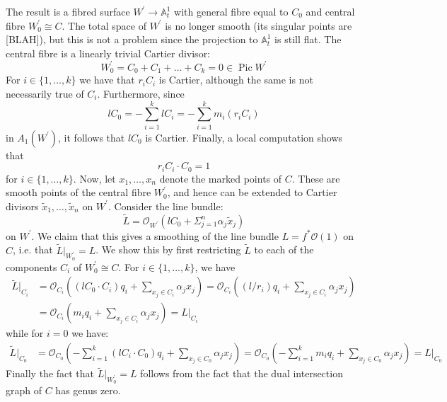 \documentclass[11pt]{amsart}
\newcommand{\OO}{\mathcal{O}}
\renewcommand{\to}{\rightarrow}
\newcommand{\Aaff}{\mathbb{A}}
\newcommand{\Pic}{\operatorname{Pic}}
\theoremstyle{definition}
\theoremstyle{definition}
\begin{document}
The result is a fibred surface $W^\prime \to \Aaff^1_t$ with general fibre equal to $C_0$ and central fibre $W^\prime_0 \cong C$. The total space of $W^\prime$ is no longer smooth (its singular points are [BLAH]), but this is not a problem since the projection to $\Aaff^1_t$ is still flat. The central fibre is a linearly trivial Cartier divisor:
\begin{equation*} W^\prime_0 = C_0 + C_1 + \ldots + C_k = 0 \in \Pic W^\prime \end{equation*}
For $i \in \{1,\ldots,k\}$ we have that $r_i C_i$ is Cartier, although the same is not necessarily true of $C_i$. Furthermore, since
\begin{equation*} l C_0 = - \sum_{i=1}^k l C_i = - \sum_{i=1}^k m_i (r_i C_i) \end{equation*}
in $A_1(W^\prime)$, it follows that $lC_0$ is Cartier. Finally, a local computation shows that
\begin{equation*} r_i C_i \cdot C_0 = 1 \end{equation*}
for $i \in \{1,\ldots,k\}$. Now, let $x_1,\ldots,x_n$ denote the marked points of $C$. These are smooth points of the central fibre $W^\prime_0$, and hence can be extended to Cartier divisors $\tilde{x}_1,\ldots,\tilde{x}_n$ on $W^\prime$. Consider the line bundle:
\begin{equation*} \tilde{L} = \OO_{W^\prime}(l C_0 + \Sigma_{j=1}^n \alpha_j \tilde{x}_j) \end{equation*}
on $W^\prime$. We claim that this gives a smoothing of the line bundle $L=f^*\OO(1)$ on $C$, i.e. that $\tilde{L}|_{W^\prime_0} = L$. We show this by first restricting $\tilde{L}$ to each of the components $C_i$ of $W^\prime_0 \cong C$. For $i \in \{1,\ldots,k\}$, we have
\begin{align*} \tilde{L}|_{C_i} & = \OO_{C_i} \left( (l C_0 \cdot C_i) q_i + \sum_{x_j \in C_i} \alpha_j x_j \right) = \OO_{C_i} \left( (l/r_i) q_i + \sum_{x_j \in C_i} \alpha_j x_j \right)\\
& = \OO_{C_i} \left( m_i q_i + \sum_{x_j \in C_i} \alpha_j x_j \right) = L|_{C_i} \end{align*}
while for $i=0$ we have:
\begin{align*} \tilde{L}|_{C_0} & = \OO_{C_0} \left( - \sum_{i=1}^k (l C_i \cdot C_0) q_i + \sum_{x_j \in C_0} \alpha_j x_j \right) = \OO_{C_0} \left( - \sum_{i=1}^k m_i q_i + \sum_{x_j \in C_0} \alpha_j x_j \right)  = L|_{C_0} \end{align*}
Finally the fact that $\tilde{L}|_{W^\prime_0} = L$ follows from the fact that the dual intersection graph of $C$ has genus zero.
\end{document}
